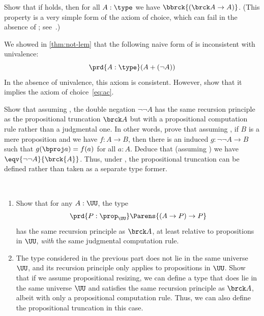 \begin{ex}\label{ex:lem-impl-simple-ac}
  Show that if \LEM{} holds, then for all $A:\type$ we have $\bbrck{(\brck A \to A)}$.
  (This property is a very simple form of the axiom of choice, which can fail in the absence of \LEM{}; see~\cite{krausgeneralizations}.)
\end{ex}

\begin{ex}\label{ex:naive-lem-impl-ac}
  We showed in \cref{thm:not-lem} that the following naive form of \LEM{} is inconsistent with univalence:
  \[ \prd{A:\type} (A+(\neg A)) \]
  In the absence of univalence, this axiom is consistent.
  However, show that it implies the axiom of choice~\eqref{eq:ac}.
\end{ex}

\begin{ex}\label{ex:lem-brck}
  Show that assuming \LEM{}, the double negation $\neg \neg A$ has the same recursion principle as the propositional truncation $\brck A$ but with a propositional computation rule rather than a judgmental one.
  In other words, prove that assuming \LEM{}, if $B$ is a mere proposition and we have $f:A\to B$, then there is an induced $g:\neg\neg A \to B$ such that $g(\bproj a) = f(a)$ for all $a:A$.
  Deduce that (assuming \LEM{}) we have $\eqv{\neg\neg A}{\brck{A}}$.
  Thus, under \LEM{}, the propositional truncation can be defined rather than taken as a separate type former.
\end{ex}

\begin{ex}\label{ex:impred-brck}\ 
  \begin{enumerate}
  \item Show that for any $A : \UU$, the type
    \[\prd{P:\prop_{\UU}} \Parens{(A\to P)\to P}\]
    has the same recursion principle as $\brck A$, at least relative to propositions in $\UU$, \emph{with} the same judgmental computation rule.
  \item The type considered in the previous part does not lie in the same universe $\UU$, and its recursion principle only applies to propositions in $\UU$.
    Show that if we assume propositional resizing, we can define a type that does lie in the same universe $\UU$ and satisfies the same recursion principle as $\brck A$, albeit with only a propositional computation rule.
    Thus, we can also define the propositional truncation in this case.
  \end{enumerate}
\end{ex}

